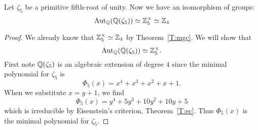 \documentclass{ximera}
\begin{document}
\begin{example}[$\boldsymbol{\aut_{\pmb\Q}\pmb(\pmb\Q\pmb(\zeta_5\pmb)\pmb)}$]
  Let $\zeta_5$ be a primitive fifth-root of
  unity. Now we have an isomorphism of groups:
  \[
  \operatorname{Aut}_{\mathbb Q}(\mathbb Q(\zeta_5))\simeq\mathbb Z_5^\times\simeq \mathbb Z_4
  \]
  \begin{proof}
    We already know that $\mathbb Z_5^\times\simeq \mathbb Z_4$ by
    Theorem~\ref{T:mgc}. We will show that
    \[
    \operatorname{Aut}_{\mathbb Q}(\mathbb Q(\zeta_5))\simeq\mathbb Z_5^\times.
    \]
    First note $\mathbb Q(\zeta_5)$ is an algebraic extension of degree $4$
    since the minimal polynomial for $\zeta_5$ is
    \[
    \Phi_5(x) = x^4+x^3+x^2 + x + 1.
    \]
    When we substitute $x = y+ 1$, we find
    \[
    \Phi_5(x) = y^{4} +5y^3+10y^2+10y+5
    \]
    which is irreducible by Eisenstein's criterion,
    Theorem~\ref{T:ec}. Thus $\Phi_5(x)$ is the minimal polynomial for
    $\zeta_5$.



\end{proof}
\end{example}
\end{document}
